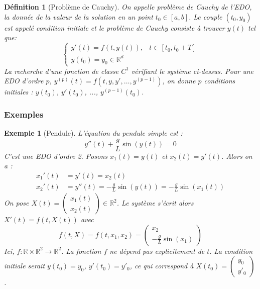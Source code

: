 \documentclass{article}
\newtheorem{definition}{Définition}
\newtheorem{example}{Exemple}
\begin{document}
\begin{definition}[Problème de Cauchy]
On appelle \textit{problème de Cauchy} de l'EDO, la donnée de la valeur de la solution en un point $t_0 \in [a, b]$.
Le couple $(t_0, y_0)$ est appelé \textit{condition initiale} et le problème de Cauchy consiste à trouver $y(t)$ tel que:
\[
\begin{cases}
    y'(t) = f(t, y(t)), & t \in [t_0, t_0 + T] \\
    y(t_0) = y_0 \in \mathbb{R}^d
\end{cases}
\]
La recherche d'une fonction de classe $C^1$ vérifiant le système ci-dessus.
Pour une EDO d'ordre $p$, $y^{(p)}(t) = f(t, y, y', \dots, y^{(p-1)})$, on donne $p$ conditions initiales : $y(t_0)$, $y'(t_0)$, ..., $y^{(p-1)}(t_0)$.
\end{definition}

\subsubsection{Exemples} %

\begin{example}[Pendule]
L'équation du pendule simple est :
\[ y''(t) + \frac{g}{L} \sin(y(t)) = 0 \]
C'est une EDO d'ordre 2.
Posons $x_1(t) = y(t)$ et $x_2(t) = y'(t)$.
Alors on a :
\begin{align*} x_1'(t) &= y'(t) = x_2(t) \\ x_2'(t) &= y''(t) = -\frac{g}{L} \sin(y(t)) = -\frac{g}{L} \sin(x_1(t)) \end{align*}
On pose $X(t) = \begin{pmatrix} x_1(t) \\ x_2(t) \end{pmatrix} \in \mathbb{R}^2$.
Le système s'écrit alors $X'(t) = f(t, X(t))$ avec
\[ f(t, X) = f(t, x_1, x_2) = \begin{pmatrix} x_2 \\ -\frac{g}{L} \sin(x_1) \end{pmatrix} \]
Ici, $f: \mathbb{R} \times \mathbb{R}^2 \to \mathbb{R}^2$. La fonction $f$ ne dépend pas explicitement de $t$.
La condition initiale serait $y(t_0) = y_0$, $y'(t_0) = y'_0$, ce qui correspond à $X(t_0) = \begin{pmatrix} y_0 \\ y'_0 \end{pmatrix}$.
\end{example}
\end{document}
